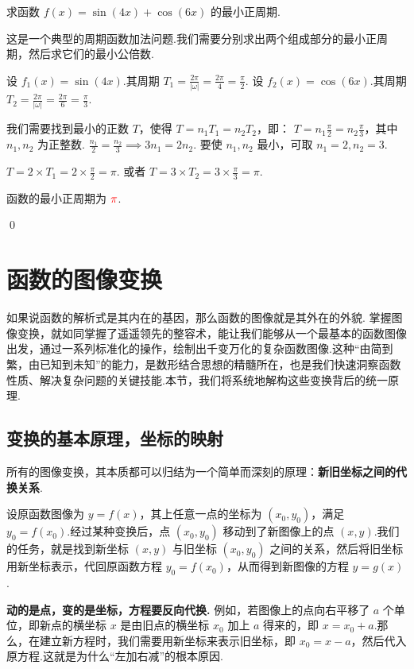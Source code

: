 \begin{exercise}
	求函数 $f(x) = \sin(4x) + \cos(6x)$ 的最小正周期.
\end{exercise}
\begin{solution}
	\textcolor{green!50!black}{这是一个典型的周期函数加法问题.我们需要分别求出两个组成部分的最小正周期，然后求它们的最小公倍数.}

		设 $f_1(x) = \sin(4x)$.其周期 $T_1 = \frac{2\pi}{|\omega|} = \frac{2\pi}{4} = \frac{\pi}{2}$.
		设 $f_2(x) = \cos(6x)$.其周期 $T_2 = \frac{2\pi}{|\omega|} = \frac{2\pi}{6} = \frac{\pi}{3}$.
		
		我们需要找到最小的正数 $T$，使得 $T = n_1 T_1 = n_2 T_2$，即：
		$T = n_1 \frac{\pi}{2} = n_2 \frac{\pi}{3}$，其中 $n_1, n_2$ 为正整数.
		$\frac{n_1}{2} = \frac{n_2}{3} \implies 3n_1 = 2n_2$.
		要使 $n_1, n_2$ 最小，可取 $n_1=2, n_2=3$.
		
		$T = 2 \times T_1 = 2 \times \frac{\pi}{2} = \pi$.
		或者 $T = 3 \times T_2 = 3 \times \frac{\pi}{3} = \pi$.

	函数的最小正周期为 $\textcolor{red}{\pi}$.
\end{solution}
\qed

\section{函数的图像变换}

\lettrine{如}{果说}函数的解析式是其内在的基因，那么函数的图像就是其外在的外貌. 掌握图像变换，就如同掌握了遥遥领先的整容术，能让我们能够从一个最基本的函数图像出发，通过一系列标准化的操作，绘制出千变万化的复杂函数图像.这种“由简到繁，由已知到未知”的能力，是数形结合思想的精髓所在，也是我们快速洞察函数性质、解决复杂问题的关键技能.本节，我们将系统地解构这些变换背后的统一原理.

\subsection{变换的基本原理，坐标的映射}
所有的图像变换，其本质都可以归结为一个简单而深刻的原理：\textbf{新旧坐标之间的代换关系}.

设原函数图像为 $y=f(x)$，其上任意一点的坐标为 $(x_0, y_0)$，满足 $y_0=f(x_0)$.经过某种变换后，点 $(x_0, y_0)$ 移动到了新图像上的点 $(x,y)$.我们的任务，就是找到新坐标 $(x,y)$ 与旧坐标 $(x_0, y_0)$ 之间的关系，然后将旧坐标用新坐标表示，代回原函数方程 $y_0=f(x_0)$，从而得到新图像的方程 $y=g(x)$.

\begin{note}[核心思想]
	\textbf{动的是点，变的是坐标，方程要反向代换.}
	例如，若图像上的点向右平移了 $a$ 个单位，即新点的横坐标 $x$ 是由旧点的横坐标 $x_0$ 加上 $a$ 得来的，即 $x=x_0+a$.那么，在建立新方程时，我们需要用新坐标来表示旧坐标，即 $x_0=x-a$，然后代入原方程.这就是为什么“左加右减”的根本原因.
\end{note}

